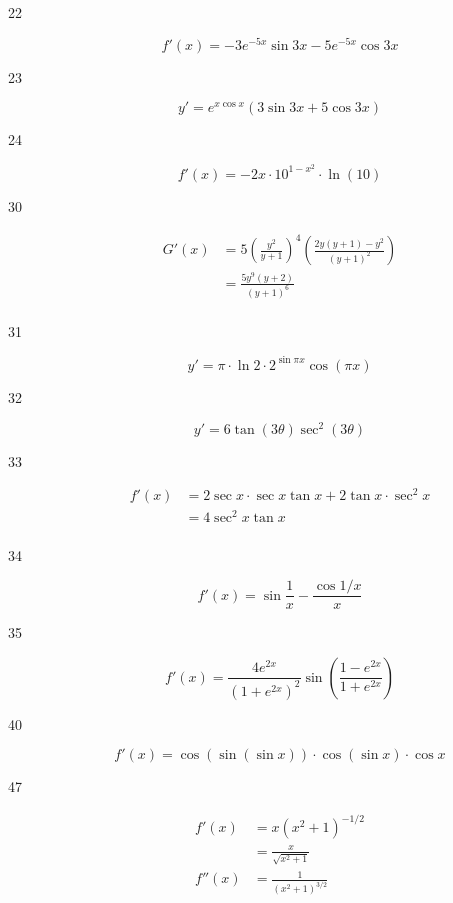 \documentclass[letterpaper, landscape]{exam}
\begin{document}
\begin{description}
    \item[22] 
      \[
        f'(x) = \boxed{ -3e^{-5x} \sin 3x - 5e^{-5x} \cos 3x }
      \]

    \item[23] 
      \[
        y' = \boxed{ e^{x \cos x} ( 3 \sin 3x + 5 \cos 3x ) }
      \]

    \item[24] 
      \[
        f'(x) = \boxed{ -2x \cdot 10^{1 - x^2} \cdot \ln(10) } 
      \]

    \item[30] 
      \begin{align*}
        G'(x) & = 5 \left( \frac{y^2}{y + 1} \right)^4 \left(  \frac{2y (y + 1) - y^2 }{(y + 1)^2}  \right) \\
              & = \boxed{ \frac{5 y^9 (y + 2)}{(y + 1)^6} } \\
      \end{align*}

    \item[31] 
      \[
        y' = \boxed{ \pi \cdot \ln 2 \cdot 2^{\sin \pi x} \cos(\pi x) }
      \]

    \item[32] 
      \[
        y' = \boxed{ 6 \tan(3 \theta) \sec^2 (3 \theta) }
      \]

    \item[33] 
      \begin{align*}
        f'(x) & = 2 \sec x \cdot \sec x \tan x + 2 \tan x \cdot \sec^2 x \\
              & = \boxed{ 4 \sec^2 x \tan x } \\
      \end{align*}

    \item[34] 
      \[
        f'(x) = \boxed{ \sin \frac{1}{x} - \frac{\cos 1/x}{x} } 
      \]

    \item[35] 
      \[
        f'(x) = \boxed{ \frac{4 e^{2x}}{\left( 1 + e^{2x} \right)^2} 
          \sin \left( \frac{1 - e^{2x}}{1 + e^{2x}} \right) }
      \]

    \item[40] 
      \[
        f'(x) = \boxed{ \cos(\sin(\sin x)) \cdot \cos(\sin x) \cdot \cos x }
      \]

    \item[47] 
      \begin{align*}
        f'(x)  & = x \left( x^2 + 1 \right)^{-1/2} \\
               & = \boxed{ \frac{x}{\sqrt{x^2 + 1}} } \\
        f''(x) & = \boxed{ \frac{1}{\left( x^2 + 1 \right)^{3/2}} } \\
      \end{align*}


\end{description}
\end{document}
